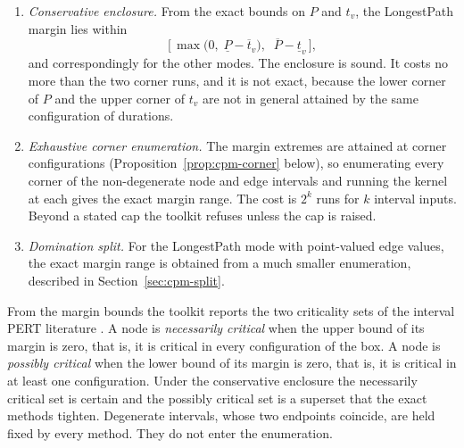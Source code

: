 \documentclass[12pt]{report}
\begin{document}
\begin{enumerate}
\item \emph{Conservative enclosure.} From the exact bounds on $P$ and $t_v$, the LongestPath
  margin lies within
  \begin{equation}
  \label{eq:cpm-enclosure}
  \bigl[\, \max\bigl(0,\; \underline{P} - \overline{t}_v\bigr),\;\; \overline{P} - \underline{t}_v \,\bigr] ,
  \end{equation}
  and correspondingly for the other modes. The enclosure is sound. It costs no more than
  the two corner runs, and it is not exact, because the lower corner of $P$ and the upper
  corner of $t_v$ are not in general attained by the same configuration of durations.
\item \emph{Exhaustive corner enumeration.} The margin extremes are attained at corner
  configurations (Proposition~\ref{prop:cpm-corner} below), so enumerating every corner of
  the non-degenerate node and edge intervals and running the kernel at each gives the
  exact margin range. The cost is $2^k$ runs for $k$ interval inputs. Beyond a stated cap
  the toolkit refuses unless the cap is raised.
\item \emph{Domination split.} For the LongestPath mode with point-valued edge values, the exact
  margin range is obtained from a much smaller enumeration, described in
  Section~\ref{sec:cpm-split}.
\end{enumerate}

From the margin bounds the toolkit reports the two criticality sets of the interval PERT
literature \cite{chanas2002complexity}. A node is \emph{necessarily critical} when the
upper bound of its margin is zero, that is, it is critical in every configuration of the
box. A node is \emph{possibly critical} when the lower bound of its margin is zero, that
is, it is critical in at least one configuration. Under the conservative enclosure the
necessarily critical set is certain and the possibly critical set is a superset that the
exact methods tighten. Degenerate intervals, whose two endpoints coincide, are held fixed by every method. They do
not enter the enumeration.
\end{document}
